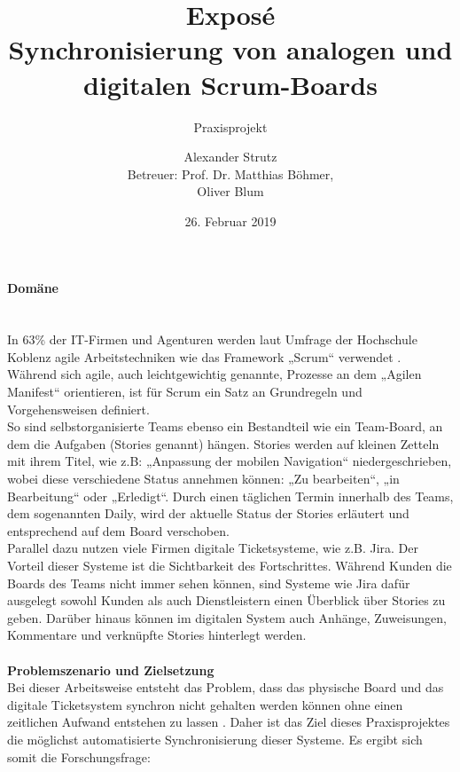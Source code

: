 \documentclass[12pt,titlepage]{scrartcl}
\begin{document}
	\begin{titlepage}
		\title{Exposé \\ \glqq Synchronisierung von analogen und digitalen Scrum-Boards\grqq{}} 
		\subtitle{Praxisprojekt}
		\author{Alexander Strutz \vspace{0.5cm}\\ Betreuer: 
		Prof. Dr. Matthias Böhmer,\\Oliver Blum}
 		\date{26. Februar 2019}
		\maketitle
	\end{titlepage}
	\paragraph{Domäne} \leavevmode \\
	In 63\% der IT-Firmen und Agenturen werden laut Umfrage der Hochschule Koblenz agile Arbeitstechniken wie das Framework „Scrum“ verwendet \cite{hskob}. Während sich agile, auch leichtgewichtig genannte, Prozesse an dem „Agilen Manifest“ orientieren, ist für Scrum ein Satz an Grundregeln und Vorgehensweisen definiert. \\
So sind selbstorganisierte Teams ebenso ein Bestandteil wie ein Team-Board, an dem die Aufgaben (Stories genannt) hängen. Stories werden auf kleinen Zetteln mit ihrem Titel, wie z.B: „Anpassung der mobilen Navigation“ niedergeschrieben, wobei diese verschiedene Status annehmen können: „Zu bearbeiten“, „in Bearbeitung“ oder „Erledigt“. Durch einen täglichen Termin innerhalb des Teams, dem sogenannten Daily, wird der aktuelle Status der Stories erläutert und entsprechend auf dem Board verschoben. \\
Parallel dazu nutzen viele Firmen digitale Ticketsysteme, wie z.B. Jira. Der Vorteil dieser Systeme ist die Sichtbarkeit des Fortschrittes. Während Kunden die Boards des Teams nicht immer sehen können, sind Systeme wie Jira dafür ausgelegt sowohl Kunden als auch Dienstleistern einen Überblick über Stories zu geben. Darüber hinaus können im digitalen System auch Anhänge, Zuweisungen, Kommentare und verknüpfte Stories hinterlegt werden. \\ \\
\textbf{Problemszenario und Zielsetzung} \\
Bei dieser Arbeitsweise entsteht das Problem, dass das physische Board und das digitale Ticketsystem synchron  nicht gehalten werden können ohne einen zeitlichen Aufwand entstehen zu lassen \cite{sync}. Daher ist das Ziel dieses Praxisprojektes die möglichst automatisierte Synchronisierung dieser Systeme. Es ergibt sich somit die Forschungsfrage: \\
\end{document}

